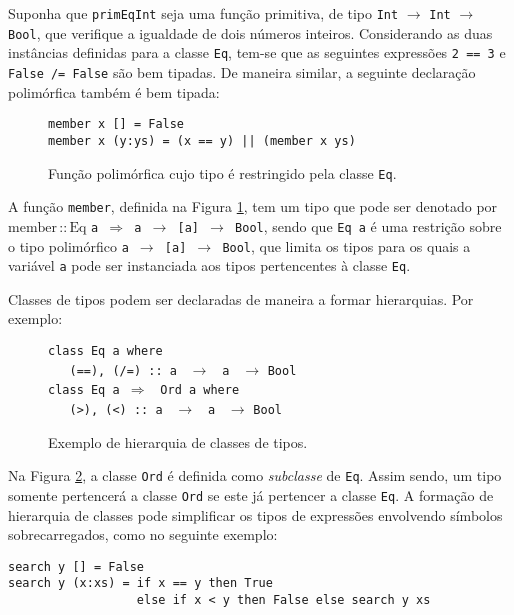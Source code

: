 Suponha que \texttt{primEqInt} seja uma fun\c{c}\~ao primitiva, de tipo \texttt{Int} 
$\rightarrow$ \texttt{Int} $\rightarrow$ \texttt{Bool}, que verifique a igualdade de dois 
n\'umeros inteiros. Considerando as duas inst\^ancias definidas para a classe \texttt{Eq}, 
tem-se que as seguintes express\~oes \texttt{2 == 3} e \texttt{False /= False} s\~ao bem 
tipadas. De maneira similar, a seguinte declara\c{c}\~ao polim\'orfica tamb\'em \'e bem tipada:
\begin{figure}[h]
  \begin{flushleft}
     \texttt{member x [] = False}\\
     \texttt{member x (y:ys) = (x == y) || (member x ys)}
  \end{flushleft}
  \caption{Fun\c{c}\~ao polim\'orfica cujo tipo \'e restringido pela classe \texttt{Eq}.}
  \label{fig7}
\end{figure}

A fun\c{c}\~ao \texttt{member}, definida na Figura \ref{fig7}, tem um tipo que pode ser denotado 
por \texttt{$\text{member}\,\text{::}\, \text{Eq}\,\, $\texttt{a} $\Rightarrow$ a $\rightarrow$ [a] $\rightarrow$ Bool}, 
sendo que \texttt{Eq a} \'e uma restri\c{c}\~ao sobre o tipo polim\'orfico 
\texttt{a $\rightarrow$ [a] $\rightarrow$ Bool}, que limita os tipos para os 
quais a vari\'avel \texttt{a} pode ser instanciada aos tipos pertencentes \`a classe \texttt{Eq}.

Classes de tipos podem ser declaradas de maneira a formar hierarquias. Por exemplo:

\begin{figure}[h]
      \verb|class Eq a where|\\
      \verb|   (==), (/=) :: a | $\rightarrow$ \verb| a | $\rightarrow$ \verb|Bool|\\
      \verb|class Eq a |$\Rightarrow$ \verb| Ord a where|\\
      \verb|   (>), (<) :: a | $\rightarrow$ \verb| a | $\rightarrow$ \verb|Bool|\\
   \caption{Exemplo de hierarquia de classes de tipos.}
   \label{fig10}
\end{figure}

Na Figura \ref{fig10}, a classe \texttt{Ord} \'e definida como \emph{subclasse} de \texttt{Eq}. 
Assim sendo, um tipo somente pertencer\'a a classe \texttt{Ord} se este j\'a pertencer a classe 
\texttt{Eq}. A forma\c{c}\~ao de hierarquia de classes pode simplificar os tipos de express\~oes 
envolvendo s\'imbolos sobrecarregados, como no seguinte exemplo:
\begin{verbatim}
search y [] = False
search y (x:xs) = if x == y then True
                  else if x < y then False else search y xs
\end{verbatim} 

